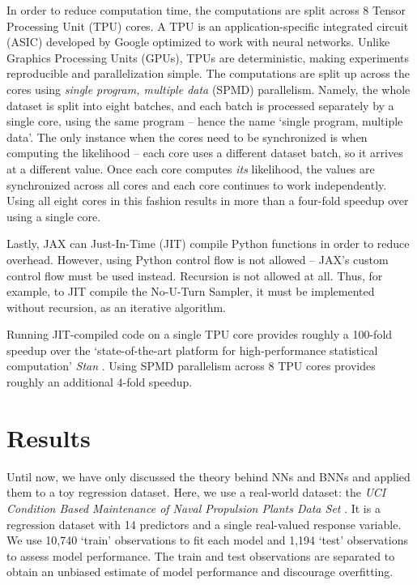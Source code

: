 \documentclass[12pt]{article}
\begin{document}
In order to reduce computation time, the computations are split across 8 Tensor Processing Unit (TPU) cores. A TPU is an application-specific integrated circuit (ASIC) developed by Google optimized to work with neural networks. Unlike Graphics Processing Units (GPUs), TPUs are deterministic, making experiments reproducible and parallelization simple. The computations are split up across the cores using \textit{single program, multiple data} (SPMD) parallelism. Namely, the whole dataset is split into eight batches, and each batch is processed separately by a single core, using the same program -- hence the name `single program, multiple data'. The only instance when the cores need to be synchronized is when computing the likelihood -- each core uses a different dataset batch, so it arrives at a different value. Once each core computes \textit{its} likelihood, the values are synchronized across all cores and each core continues to work independently. Using all eight cores in this fashion results in more than a four-fold speedup over using a single core. 

Lastly, JAX can Just-In-Time (JIT) compile Python functions in order to reduce overhead. However, using Python control flow is not allowed -- JAX's custom control flow must be used instead. Recursion is not allowed at all. Thus, for example, to JIT compile the No-U-Turn Sampler, it must be implemented without recursion, as an iterative algorithm.

Running JIT-compiled code on a single TPU core provides roughly a 100-fold speedup over the `state-of-the-art platform for high-performance statistical computation' \textit{Stan} \cite{stan}. Using SPMD parallelism across 8 TPU cores provides roughly an additional 4-fold speedup.

\section{Results}
\label{sec_results}

Until now, we have only discussed the theory behind NNs and BNNs and applied them to a toy regression dataset. Here, we use a real-world dataset: the \textit{UCI Condition Based Maintenance of Naval Propulsion Plants Data Set} \cite{uci}. It is a regression dataset with 14 predictors and a single real-valued response variable. We use 10,740 `train' observations to fit each model and 1,194 `test' observations to assess model performance. The train and test observations are separated to obtain an unbiased estimate of model performance and discourage overfitting.
\end{document}
